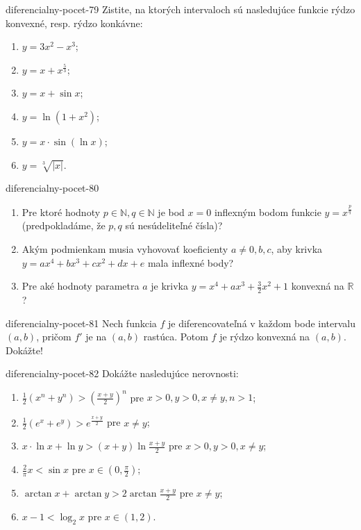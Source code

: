 \begin{defproblem}{diferencialny-pocet-79}
Zistite, na ktorých intervaloch sú nasledujúce funkcie rýdzo konvexné, resp. rýdzo konkávne:
\begin{multicols}{2}
\begin{enumerate}
    \item $y=3x^2-x^3$;
	\item $y=x+x^{\frac{5}{3}}$;
	\item $y=x+\sin x$;
	\item $y=\ln (1+x^2)$;
	\item $y=x\cdot\sin (\ln x)$;
	\item $y=\sqrt[3]{|x|}$.
\end{enumerate}
\end{multicols}
\end{defproblem}

\begin{defproblem}{diferencialny-pocet-80}
\begin{enumerate}
\item Pre ktoré hodnoty $p\in\mathbb{N},q\in\mathbb{N}$ je bod $x=0$ inflexným bodom funkcie $y=x^{\frac{p}{q}}$ (predpokladáme, že $p,q$ sú nesúdeliteľné čísla)?
\item Akým podmienkam musia vyhovovať koeficienty $a\neq 0,b,c$, aby krivka $y=ax^4+bx^3+cx^2+dx+e$ mala inflexné body?
\item Pre aké hodnoty parametra $a$ je krivka $y=x^4+ax^3+\frac{3}{2}x^2+1$ konvexná na $\mathbb{R}$?
\end{enumerate}
\end{defproblem}

\begin{defproblem}{diferencialny-pocet-81}
Nech funkcia $f$ je diferencovateľná v každom bode intervalu $(a,b)$, pričom $f'$ je na $(a,b)$ rastúca. Potom $f$ je rýdzo konvexná na $(a,b)$. Dokážte!
\end{defproblem}

\begin{defproblem}{diferencialny-pocet-82}
Dokážte nasledujúce nerovnosti:
\begin{enumerate}
\item $\frac{1}{2}(x^n+y^n)>(\frac{x+y}{2})^n$ pre $x>0,y>0,x\neq y,n>1$;
\item  $\frac{1}{2}(e^x+e^y)>e^{\frac{x+y}{2}}$ pre $x\neq y$;
\item $x\cdot\ln x+\ln y>(x+y)\ln \frac{x+y}{2}$ pre $x>0,y>0,x\neq y$;
\item $\frac{2}{\pi}x<\sin x$ pre $x\in (0,\frac{\pi}{2})$;
\item $\arctan x+\arctan y>2\arctan \frac{x+y}{2}$ pre $x\neq y$;
\item $x-1<\log_2 x$ pre $x\in (1,2)$.
\end{enumerate}
\end{defproblem}

